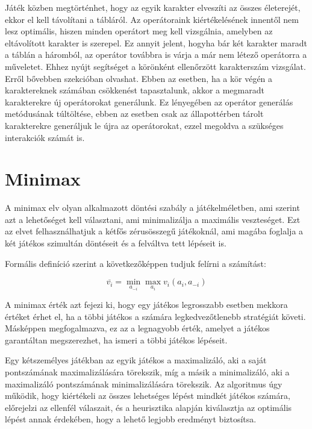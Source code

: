 \documentclass[
]{thesis-ekf}
\theoremstyle{definition}
\theoremstyle{remark}
\begin{document}


Játék közben megtörténhet, hogy az egyik karakter elveszíti az összes életerejét, ekkor el kell távolítani a tábláról. Az operátoraink kiértékelésének innentől nem lesz optimális, hiszen minden operátort meg kell vizsgálnia, amelyben az eltávolított karakter is szerepel. Ez annyit jelent, hogyha bár két karakter maradt a táblán a háromból, az operátor továbbra is várja a már nem létező operátorra a műveletet. Ehhez nyújt segítséget a körönként ellenőrzött karakterszám vizsgálat. Erről bővebben  szekcióban olvashat. Ebben az esetben, ha a kör végén a karaktereknek számában csökkenést tapasztalunk, akkor a megmaradt karakterekre új operátorokat generálunk. Ez lényegében az operátor generálás metódusának túltöltése, ebben az esetben csak az állapottérben tárolt karakterekre generáljuk le újra az operátorokat, ezzel megoldva a szükséges interakciók számát is.


\section{Minimax} \label{minimax}

A minimax elv olyan alkalmazott döntési szabály a játékelméletben, ami szerint azt a lehetőséget kell választani, ami minimalizálja a maximális veszteséget. Ezt az elvet felhasználhatjuk a kétfős zérusösszegű játékoknál, ami magába foglalja a két játékos szimultán döntéseit és a felváltva tett lépéseit is. \cite{MiniMaxEnWiki}

Formális definíció szerint a következőképpen tudjuk felírni a számítást: \cite{MiniMaxEnWiki}

\begin{equation*}
	\overline{v_{i}}=\underset{{a_{-i}}}{\min} \underset{{a_{i}}}{\max} v_{i}(a_{i}, a_{-i})
\end{equation*}

A minimax érték azt fejezi ki, hogy egy játékos legrosszabb esetben mekkora értéket érhet el, ha a többi játékos a számára legkedvezőtlenebb stratégiát követi. Másképpen megfogalmazva, ez az a legnagyobb érték, amelyet a játékos garantáltan megszerezhet, ha ismeri a többi játékos lépéseit. 

Egy kétszemélyes játékban az egyik játékos a maximalizáló, aki a saját pontszámának maximalizálására törekszik, míg a másik a minimalizáló, aki a maximalizáló pontszámának minimalizálására törekszik. Az algoritmus úgy működik, hogy kiértékeli az összes lehetséges lépést mindkét játékos számára, előrejelzi az ellenfél válaszait, és a heurisztika alapján kiválasztja az optimális lépést annak érdekében, hogy a lehető legjobb eredményt biztosítsa. \cite{MiniMaxGfG}
\end{document}
